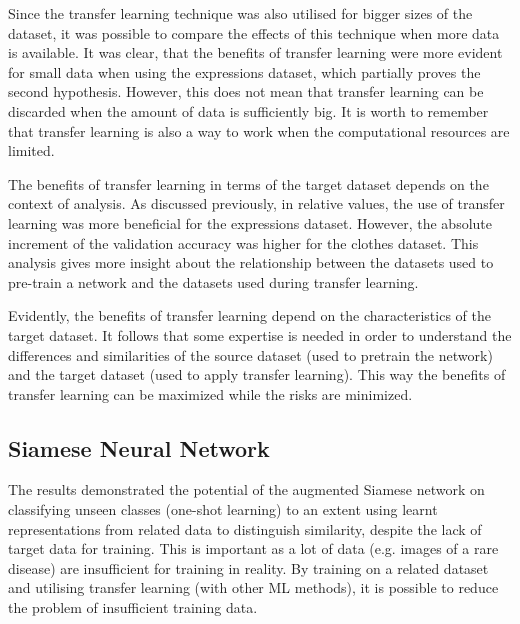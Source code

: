 \documentclass{article}
\begin{document}
Since the transfer learning technique was also utilised for bigger sizes of the dataset, it was possible to compare the effects of this technique when more data is available. It was clear, that the benefits of transfer learning were more evident for small data when using the expressions dataset, which partially proves the second hypothesis. However, this does not mean that transfer learning can be discarded when the amount of data is sufficiently big. It is worth to remember that transfer learning is also a way to work when the computational resources are limited.

The benefits of transfer learning in terms of the target dataset depends on the context of analysis. As discussed previously, in relative values, the use of transfer learning was more beneficial for the expressions dataset. However, the absolute increment of the validation accuracy was higher for the clothes dataset. This analysis gives more insight about the relationship between the datasets used to pre-train a network and the datasets used during transfer learning.     
 
Evidently, the benefits of transfer learning depend on the characteristics of the target dataset. It follows that some expertise is needed in order to understand the differences and similarities of the source dataset (used to pretrain the network) and the target dataset (used to apply transfer learning). This way the benefits of transfer learning can be maximized while the risks are minimized.

\subsection{Siamese Neural Network}

The results demonstrated the potential of the augmented Siamese network on classifying unseen classes (one-shot learning) to an extent using learnt representations from related data to distinguish similarity, despite the lack of target data for training. This is important as a lot of data (e.g. images of a rare disease) are insufficient for training in reality. By training on a related dataset and utilising transfer learning (with other ML methods), it is possible to reduce the problem of insufficient training data.




\newpage

\appendix
\end{document}
